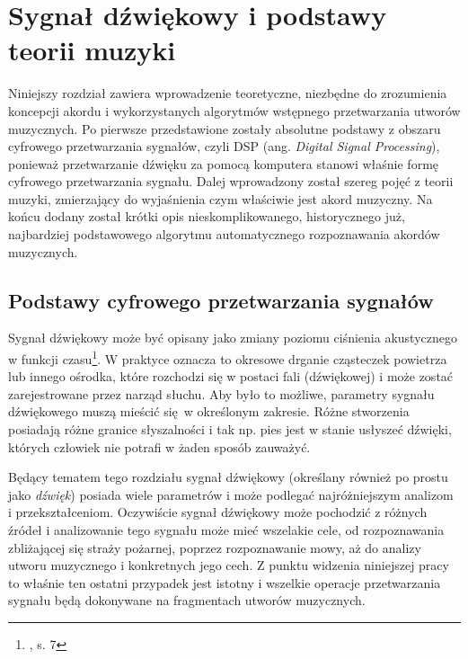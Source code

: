 \chapter{Sygnał dźwiękowy i podstawy teorii muzyki\hspace{5pt}} \label{chapter:music_theory}

Niniejszy rozdział zawiera wprowadzenie teoretyczne, niezbędne do zrozumienia koncepcji akordu i wykorzystanych algorytmów wstępnego przetwarzania utworów muzycznych. Po pierwsze przedstawione zostały absolutne podstawy z obszaru cyfrowego przetwarzania sygnałów, czyli DSP (ang. \emph{Digital Signal Processing}), ponieważ przetwarzanie dźwięku za pomocą komputera stanowi właśnie formę cyfrowego przetwarzania sygnału. Dalej wprowadzony został szereg pojęć z teorii muzyki, zmierzający do wyjaśnienia czym właściwie jest akord muzyczny. Na końcu dodany został krótki opis nieskomplikowanego, historycznego już, najbardziej podstawowego algorytmu automatycznego rozpoznawania akordów muzycznych.



\section{Podstawy cyfrowego przetwarzania sygnałów}

Sygnał dźwiękowy może być opisany jako zmiany poziomu ciśnienia akustycznego w funkcji czasu\footnote{\cite{lerch_introduction_2012}, s. 7}. W praktyce oznacza to okresowe drganie cząsteczek powietrza lub innego ośrodka, które rozchodzi się w postaci fali (dźwiękowej) i może zostać zarejestrowane przez narząd słuchu. Aby było to możliwe, parametry sygnału dźwiękowego muszą mieścić się w określonym zakresie. Różne stworzenia posiadają różne granice słyszalności i tak np. pies jest w stanie usłyszeć dźwięki, których człowiek nie potrafi w żaden sposób zauważyć. 

Będący tematem tego rozdziału sygnał dźwiękowy (określany również po prostu jako \emph{dźwięk}) posiada wiele parametrów i może podlegać najróżniejszym analizom i przekształceniom.  Oczywiście sygnał dźwiękowy może pochodzić z różnych źródeł i analizowanie tego sygnału może mieć wszelakie cele, od rozpoznawania zbliżającej się straży pożarnej, poprzez rozpoznawanie mowy, aż do analizy utworu muzycznego i konkretnych jego cech. Z punktu widzenia niniejszej pracy to właśnie ten ostatni przypadek jest istotny i wszelkie operacje przetwarzania sygnału będą dokonywane na fragmentach utworów muzycznych.

